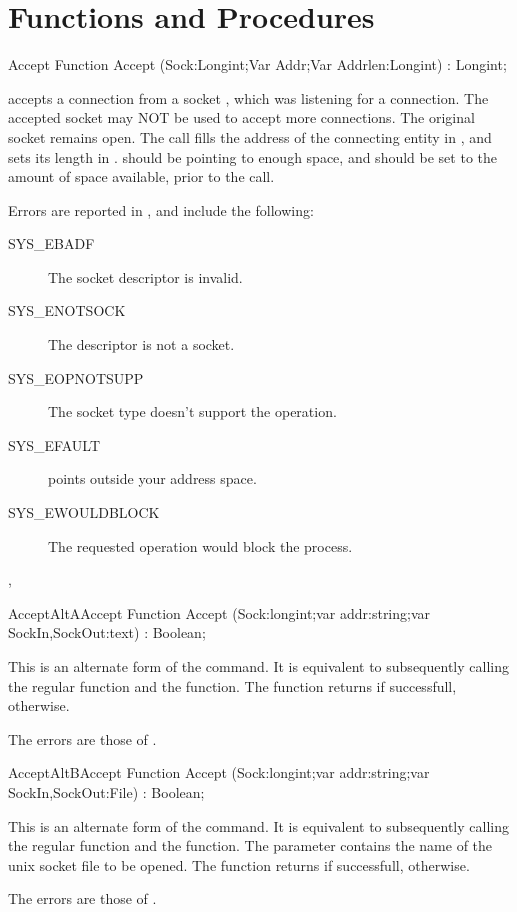 \section {Functions and Procedures}
\begin{function}{Accept}
\Declaration
Function Accept (Sock:Longint;Var Addr;Var Addrlen:Longint) : Longint;

\Description
{} accepts a connection from a socket , which was
listening for a connection. The accepted socket may NOT be used to accept
more connections. The original socket remains open.
The  call fills the address of the connecting entity in ,
and sets its length in .  should be pointing to
enough space, and  should be set to the amount of space
available, prior to the call.

\Errors
Errors are reported in , and include the following:
\begin{description}
\item[SYS\_EBADF] The socket descriptor is invalid.
\item[SYS\_ENOTSOCK] The descriptor is not a socket.
\item[SYS\_EOPNOTSUPP] The socket type doesn't support the 
operation.
\item[SYS\_EFAULT]  points outside your address space.
\item[SYS\_EWOULDBLOCK] The requested operation would block the process.
\end{description}

\SeeAlso
{}, 
\end{function}
\html{}
\begin{functionl}{Accept}{AltAAccept}
\Declaration
Function Accept (Sock:longint;var addr:string;var SockIn,SockOut:text) : Boolean;

\Description
 This is an alternate form of the  command. It is equivalent
to subsequently calling the regular 
function and the  function.
The function returns  if successfull,  otherwise.

\Errors
The errors are those of .
\SeeAlso
{}
\end{functionl}
\begin{functionl}{Accept}{AltBAccept}
\Declaration
Function Accept (Sock:longint;var addr:string;var SockIn,SockOut:File) : Boolean;

\Description
 This is an alternate form of the  command. 
It is equivalent
to subsequently calling the regular  function and the 
 function.
The  parameter contains the name of the unix socket file to be
opened. 
The function returns  if successfull,  otherwise.

\Errors
The errors are those of .
\SeeAlso
{}
\end{functionl}
